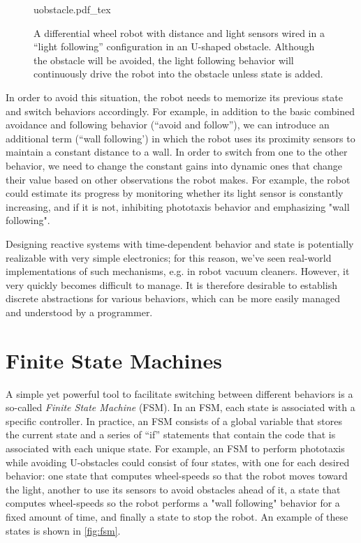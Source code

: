 \begin{figure}
\centering
    \def\svgwidth{0.64\textwidth}
    {uobstacle.pdf_tex}
    \caption{\label{fig:uobstacle}A differential wheel robot with distance and light sensors wired in a ``light following'' configuration in an U-shaped obstacle. Although the obstacle will be avoided, the light following behavior will continuously drive the robot into the obstacle unless state is added.}
\end{figure}

In order to avoid this situation, the robot needs to memorize its previous state and switch behaviors accordingly. For example, in addition to the basic combined avoidance and following behavior (``avoid and follow''), we can introduce an additional term (``wall following') in which the robot uses its proximity sensors to maintain a constant distance to a wall. In order to switch from one to the other behavior, we need to change the constant gains into dynamic ones that change their value based on other observations the robot makes. For example, the robot could estimate its progress by monitoring whether its light sensor is constantly increasing, and if it is not, inhibiting phototaxis behavior and emphasizing "wall following".

Designing reactive systems with time-dependent behavior and state is potentially realizable with very simple electronics; for this reason, we've seen real-world implementations of such mechanisms, e.g. in robot vacuum cleaners.
However, it very quickly becomes difficult to manage. It is therefore desirable to establish discrete abstractions for various behaviors, which can be more easily managed and understood by a programmer.

\section{Finite State Machines}\label{sec:fsm}

A simple yet powerful tool to facilitate switching between different behaviors is a so-called \textsl{Finite State Machine} (FSM). In an FSM, each state is associated with a specific controller. In practice, an FSM consists of a global variable that stores the current state and a series of ``if'' statements that contain the code that is associated with each unique state. For example, an FSM to perform phototaxis while avoiding U-obstacles could consist of four states, with one for each desired behavior: one state that computes wheel-speeds so that the robot moves toward the light, another to use its sensors to avoid obstacles ahead of it, a state that computes wheel-speeds so the robot performs a "wall following" behavior for a fixed amount of time, and finally a state to stop the robot. An example of these states is shown in \cref{fig:fsm}.


